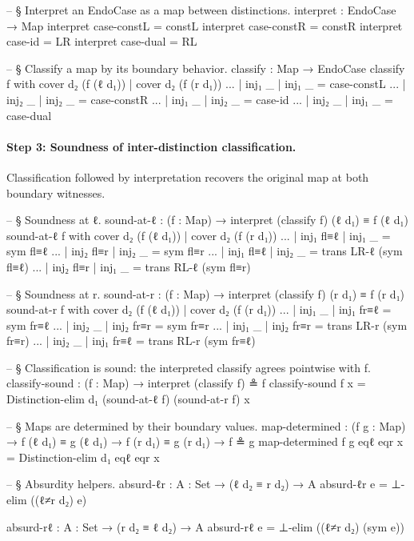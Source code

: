 \documentclass[11pt,a4paper]{book}
\begin{document}
\begin{code}
  -- § Interpret an EndoCase as a map between distinctions.
  interpret : EndoCase → Map
  interpret case-constL = constL
  interpret case-constR = constR
  interpret case-id     = LR
  interpret case-dual   = RL

  -- § Classify a map by its boundary behavior.
  classify : Map → EndoCase
  classify f with cover d₂ (f (ℓ d₁)) | cover d₂ (f (r d₁))
  ... | inj₁ _ | inj₁ _ = case-constL
  ... | inj₂ _ | inj₂ _ = case-constR
  ... | inj₁ _ | inj₂ _ = case-id
  ... | inj₂ _ | inj₁ _ = case-dual
\end{code}

\paragraph{Step 3: Soundness of inter-distinction classification.}
Classification followed by interpretation recovers the original map at both boundary witnesses.

\begin{code}
  -- § Soundness at ℓ.
  sound-at-ℓ : (f : Map) → interpret (classify f) (ℓ d₁) ≡ f (ℓ d₁)
  sound-at-ℓ f with cover d₂ (f (ℓ d₁)) | cover d₂ (f (r d₁))
  ... | inj₁ fl≡ℓ | inj₁ _     = sym fl≡ℓ
  ... | inj₂ fl≡r | inj₂ _     = sym fl≡r
  ... | inj₁ fl≡ℓ | inj₂ _     = trans LR-ℓ (sym fl≡ℓ)
  ... | inj₂ fl≡r | inj₁ _     = trans RL-ℓ (sym fl≡r)

  -- § Soundness at r.
  sound-at-r : (f : Map) → interpret (classify f) (r d₁) ≡ f (r d₁)
  sound-at-r f with cover d₂ (f (ℓ d₁)) | cover d₂ (f (r d₁))
  ... | inj₁ _     | inj₁ fr≡ℓ = sym fr≡ℓ
  ... | inj₂ _     | inj₂ fr≡r = sym fr≡r
  ... | inj₁ _     | inj₂ fr≡r = trans LR-r (sym fr≡r)
  ... | inj₂ _     | inj₁ fr≡ℓ = trans RL-r (sym fr≡ℓ)

  -- § Classification is sound: the interpreted classify agrees pointwise with f.
  classify-sound : (f : Map) → interpret (classify f) ≗ f
  classify-sound f x = Distinction-elim d₁ (sound-at-ℓ f) (sound-at-r f) x

  -- § Maps are determined by their boundary values.
  map-determined :
    (f g : Map) →
    f (ℓ d₁) ≡ g (ℓ d₁) →
    f (r d₁) ≡ g (r d₁) →
    f ≗ g
  map-determined f g eqℓ eqr x = Distinction-elim d₁ eqℓ eqr x

  -- § Absurdity helpers.
  absurd-ℓr : {A : Set} → (ℓ d₂ ≡ r d₂) → A
  absurd-ℓr e = ⊥-elim ((ℓ≠r d₂) e)

  absurd-rℓ : {A : Set} → (r d₂ ≡ ℓ d₂) → A
  absurd-rℓ e = ⊥-elim ((ℓ≠r d₂) (sym e))
\end{code}
\end{document}
